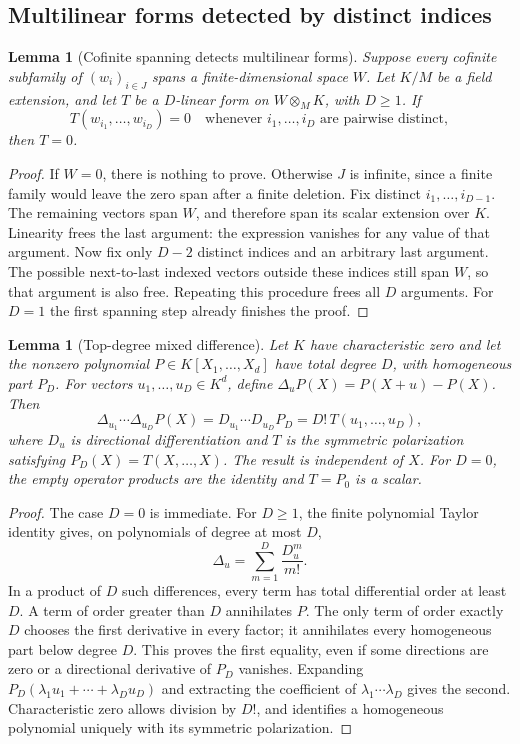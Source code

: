 \documentclass[11pt,a4paper]{article}
\numberwithin{equation}{section}
\newtheorem{lemma}[theorem]{Lemma}
\theoremstyle{definition}
\theoremstyle{remark}
\begin{document}
\subsection{Multilinear forms detected by distinct indices}
\begin{lemma}[Cofinite spanning detects multilinear forms]\label{tail:lem:multilinear}
Suppose every cofinite subfamily of $(w_i)_{i\in J}$ spans a finite-dimensional
space $W$. Let $K/M$ be a field extension, and let $T$ be a $D$-linear form
on $W\otimes_M K$, with $D\geq1$. If
\[
 T(w_{i_1},\ldots,w_{i_D})=0
 \quad\text{whenever }i_1,\ldots,i_D\text{ are pairwise distinct},
\]
then $T=0$.
\end{lemma}
\begin{proof}
If $W=0$, there is nothing to prove. Otherwise $J$ is infinite, since a
finite family would leave the zero span after a finite deletion.
Fix distinct $i_1,\ldots,i_{D-1}$. The remaining vectors span $W$, and
therefore span its scalar extension over $K$. Linearity frees the last
argument: the expression vanishes for any value of that argument.
Now fix only $D-2$ distinct indices and an arbitrary last argument.
The possible next-to-last indexed vectors outside these indices still
span $W$, so that argument is also free. Repeating this procedure frees
all $D$ arguments. For $D=1$ the first spanning step already finishes the
proof.
\end{proof}

\begin{lemma}[Top-degree mixed difference]\label{tail:lem:difference}
Let $K$ have characteristic zero and let the nonzero polynomial
$P\in K[X_1,\ldots,X_d]$ have total degree $D$, with homogeneous part $P_D$.
For vectors $u_1,\ldots,u_D\in K^d$, define
$\Delta_uP(X)=P(X+u)-P(X)$. Then
\begin{equation}\label{tail:eq:diffidentity}
 \Delta_{u_1}\cdots\Delta_{u_D}P(X)
  =D_{u_1}\cdots D_{u_D}P_D
  =D!\,T(u_1,\ldots,u_D),
\end{equation}
where $D_u$ is directional differentiation and $T$ is the symmetric
polarization satisfying $P_D(X)=T(X,\ldots,X)$. The result is independent
of $X$. For $D=0$, the empty operator products are the identity and
$T=P_0$ is a scalar.
\end{lemma}
\begin{proof}
The case $D=0$ is immediate. For $D\ge1$, the finite polynomial Taylor
identity gives, on polynomials of degree at most $D$,
\[
 \Delta_u=\sum_{m=1}^D\frac{D_u^m}{m!}.
\]
In a product of $D$ such differences, every term has total differential
order at least $D$. A term of order greater than $D$ annihilates $P$.
The only term of order exactly $D$ chooses the first derivative in every
factor; it annihilates every homogeneous part below degree $D$.
This proves the first equality, even if some directions are zero or a
directional derivative of $P_D$ vanishes. Expanding
$P_D(\lambda_1u_1+\cdots+\lambda_Du_D)$ and extracting the coefficient of
$\lambda_1\cdots\lambda_D$ gives the second. Characteristic zero allows
division by $D!$, and identifies a homogeneous polynomial uniquely with
its symmetric polarization.
\end{proof}
\end{document}
